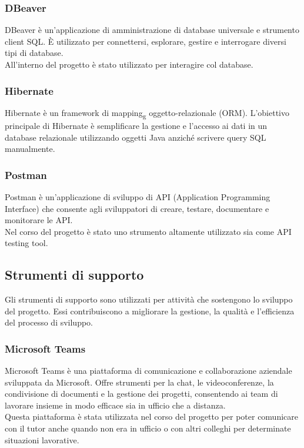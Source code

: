 \subsubsection*{DBeaver}
DBeaver è un'applicazione di amministrazione di database universale e strumento client SQL. È utilizzato per connettersi, esplorare, gestire e interrogare diversi tipi di database.\\
All'interno del progetto è stato utilizzato per interagire col database.
\\


\subsubsection*{Hibernate}
Hibernate è un framework di mapping\textsubscript{g} oggetto-relazionale (ORM). L'obiettivo principale di Hibernate è semplificare la gestione e l'accesso ai dati in un database relazionale utilizzando oggetti Java anziché scrivere query SQL manualmente.
\\


\subsubsection*{Postman}
Postman è un'applicazione di sviluppo di API (Application Programming Interface) che consente agli sviluppatori di creare, testare, documentare e monitorare le API.\\
Nel corso del progetto è stato uno strumento altamente utilizzato sia come API testing tool.\\

\subsection{Strumenti di supporto}
Gli strumenti di supporto sono utilizzati per attività che sostengono lo sviluppo del progetto. Essi contribuiscono a migliorare la gestione, la qualità e l'efficienza del processo di sviluppo.\\
 
\subsubsection*{Microsoft Teams}
Microsoft Teams è una piattaforma di comunicazione e collaborazione aziendale sviluppata da Microsoft. Offre strumenti per la chat, le videoconferenze, la condivisione di documenti e la gestione dei progetti, consentendo ai team di lavorare insieme in modo efficace sia in ufficio che a distanza.\\
Questa piattaforma è stata utilizzata nel corso del progetto per poter comunicare con il tutor anche quando non era in ufficio o con altri colleghi per determinate situazioni lavorative.


